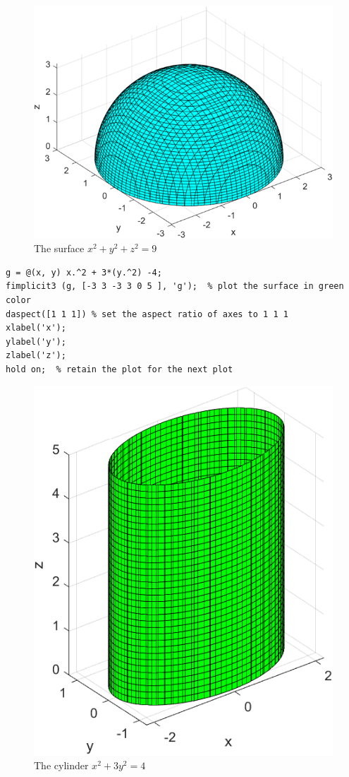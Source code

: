\begin{figure}[H]
  \centering
  \includegraphics[width=12cm]{graphics/3a1.png}
  \caption{The surface $x^2 + y^2 + z^2 = 9$}
\end{figure}

\begin{lstlisting}[style=Matlab-editor]
% Plot the surface x^2 +3y^2 = 4
g = @(x, y) x.^2 + 3*(y.^2) -4;
fimplicit3 (g, [-3 3 -3 3 0 5 ], 'g');  % plot the surface in green color
daspect([1 1 1]) % set the aspect ratio of axes to 1 1 1
xlabel('x');
ylabel('y');
zlabel('z');
hold on;  % retain the plot for the next plot
\end{lstlisting}

\begin{figure}[H]
  \centering
  \includegraphics[width=12cm]{graphics/3a2.png}
  \caption{The cylinder $x^2 + 3y^2 = 4$}
\end{figure}

